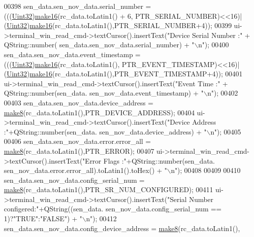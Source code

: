 \begin{DoxyCode}
00398       sen\_data.sen\_nov\_data.serial\_number =(((\hyperlink{a00001_ab56a7153a5b218eac7698ff141009735}{Uint32})\hyperlink{a00006_afcb06d9f3a6a555df9355af1dfbb4e21}{make16}(rc\_data.toLatin1() + 6,
      PTR\_SERIAL\_NUMBER)<<16)| (\hyperlink{a00001_ab56a7153a5b218eac7698ff141009735}{Uint32})\hyperlink{a00006_afcb06d9f3a6a555df9355af1dfbb4e21}{make16}(rc\_data.toLatin1(),PTR\_SERIAL\_NUMBER+4));
00399       ui->terminal\_win\_read\_cmd->textCursor().insertText(\textcolor{stringliteral}{"Device Serial Number :"} + QString::number(
      sen\_data.sen\_nov\_data.serial\_number) + \textcolor{stringliteral}{"\(\backslash\)n"});
00400       sen\_data.sen\_nov\_data.event\_timestamp = (((\hyperlink{a00001_ab56a7153a5b218eac7698ff141009735}{Uint32})\hyperlink{a00006_afcb06d9f3a6a555df9355af1dfbb4e21}{make16}(rc\_data.toLatin1(),
      PTR\_EVENT\_TIMESTAMP)<<16)| (\hyperlink{a00001_ab56a7153a5b218eac7698ff141009735}{Uint32})\hyperlink{a00006_afcb06d9f3a6a555df9355af1dfbb4e21}{make16}(rc\_data.toLatin1(),PTR\_EVENT\_TIMESTAMP+4));
00401       ui->terminal\_win\_read\_cmd->textCursor().insertText(\textcolor{stringliteral}{"Event Time    :"} + QString::number(sen\_data.
      sen\_nov\_data.event\_timestamp) + \textcolor{stringliteral}{"\(\backslash\)n"});
00402 
00403       sen\_data.sen\_nov\_data.device\_address = \hyperlink{a00006_aebce94d5e6af7afff661daf74b208de1}{make8}(rc\_data.toLatin1(),PTR\_DEVICE\_ADDRESS);
00404       ui->terminal\_win\_read\_cmd->textCursor().insertText(\textcolor{stringliteral}{"Device Address  :"}+QString::number(sen\_data.
      sen\_nov\_data.device\_address) + \textcolor{stringliteral}{"\(\backslash\)n"});
00405 
00406       sen\_data.sen\_nov\_data.error.error\_all = \hyperlink{a00006_aebce94d5e6af7afff661daf74b208de1}{make8}(rc\_data.toLatin1(),PTR\_ERROR);
00407       ui->terminal\_win\_read\_cmd->textCursor().insertText(\textcolor{stringliteral}{"Error Flags  :"}+QString::number(sen\_data.
      sen\_nov\_data.error.error\_all).toLatin1().toHex() + \textcolor{stringliteral}{"\(\backslash\)n"});
00408 
00409 
00410       sen\_data.sen\_nov\_data.config\_serial\_num = \hyperlink{a00006_aebce94d5e6af7afff661daf74b208de1}{make8}(rc\_data.toLatin1(),PTR\_SR\_NUM\_CONFIGURED);
00411       ui->terminal\_win\_read\_cmd->textCursor().insertText(\textcolor{stringliteral}{"Serial Number configered:"}+QString((sen\_data.
      sen\_nov\_data.config\_serial\_num == 1)?\textcolor{stringliteral}{"TRUE"}:\textcolor{stringliteral}{"FALSE"}) + \textcolor{stringliteral}{"\(\backslash\)n"});
00412       sen\_data.sen\_nov\_data.config\_device\_address = \hyperlink{a00006_aebce94d5e6af7afff661daf74b208de1}{make8}(rc\_data.toLatin1(),

\end{DoxyCode}

